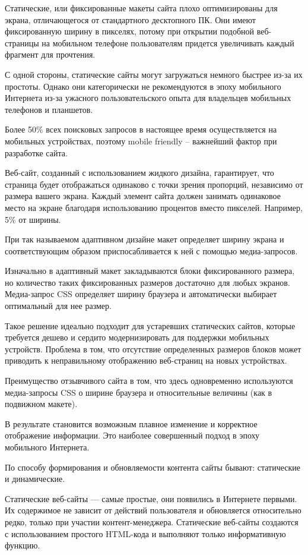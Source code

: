 Статические, или фиксированные макеты сайта плохо оптимизированы для экрана, отличающегося от стандартного десктопного ПК.
Они имеют фиксированную ширину в пикселях, потому при открытии подобной веб-страницы на мобильном телефоне пользователям придется увеличивать каждый фрагмент для прочтения.

С одной стороны, статические сайты могут загружаться немного быстрее из-за их простоты. Однако они категорически не рекомендуются в эпоху мобильного Интернета из-за ужасного пользовательского опыта для владельцев мобильных телефонов и планшетов.

Более 50\% всех поисковых запросов в настоящее время осуществляется на мобильных устройствах, поэтому mobile friendly – важнейший фактор при разработке сайта.

Веб-сайт, созданный с использованием жидкого дизайна, гарантирует, что страница будет отображаться одинаково с точки зрения пропорций, независимо от размера вашего экрана.
Каждый элемент сайта должен занимать одинаковое место на экране благодаря использованию процентов вместо пикселей.
Например, 5\% от ширины.

При так называемом адаптивном дизайне макет определяет ширину экрана и соответствующим образом приспосабливается к ней с помощью медиа-запросов.

Изначально в адаптивный макет закладываются блоки фиксированного размера, но количество таких фиксированных размеров достаточно для любых экранов.
Медиа-запрос CSS определяет ширину браузера и автоматически выбирает оптимальный для нее размер.

Такое решение идеально подходит для устаревших статических сайтов, которые требуется дешево и сердито модернизировать для поддержки мобильных устройств.
Проблема в том, что отсутствие определенных размеров блоков может приводить к неправильному отображению веб-страниц на новых устройствах.

Преимущество отзывчивого сайта в том, что здесь одновременно используются медиа-запросы CSS о ширине браузера и относительные величины (как в подвижном макете).

В результате становится возможным плавное изменение и корректное отображение информации.
Это наиболее совершенный подход в эпоху мобильного Интернета.


По способу формирования и обновляемости контента сайты бывают: статические и динамические.

Статические веб-сайты — самые простые, они появились в Интернете первыми.
Их содержимое не зависит от действий пользователя и обновляется относительно редко, только при участии контент-менеджера.
Статические веб-сайты создаются с использованием простого HTML-кода и выполняют только информативную функцию.

